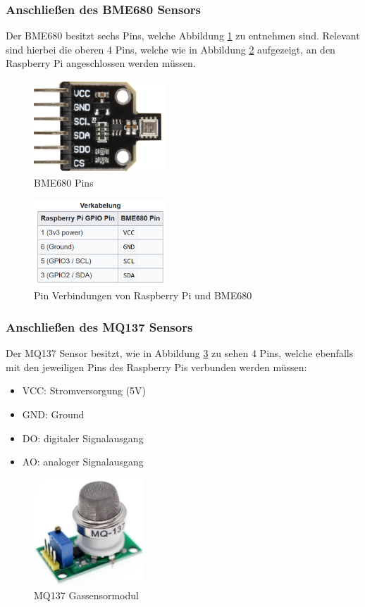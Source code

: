 \documentclass[conference]{IEEEtran}
\begin{document}
\subsubsection{Anschließen des BME680 Sensors} 


Der BME680 besitzt sechs Pins, welche Abbildung \ref{bme_pins} zu entnehmen sind. Relevant sind hierbei die oberen 4 Pins, welche wie in Abbildung \ref{verkabelung_bme} aufgezeigt, an den Raspberry Pi angeschlossen werden müssen. \cite{bme_anschluss}
\begin{figure}[H]
	\centering
	\includegraphics[width=50mm]{fig/bme_pins.png}
	\caption{BME680 Pins}
	\label{bme_pins}
\end{figure}
\begin{figure}[H]
	\centerline{\includegraphics[width=50mm]{fig/verkabelung_bme.png}}
	\caption{Pin Verbindungen von Raspberry Pi und BME680}
	\label{verkabelung_bme}
\end{figure}

\subsubsection{Anschließen des MQ137 Sensors} 

Der MQ137 Sensor besitzt, wie in Abbildung \ref{mq137_pins} zu sehen 4 Pins, welche ebenfalls mit den jeweiligen Pins des Raspberry Pis verbunden werden müssen:
\begin{itemize}
	\item VCC: Stromversorgung (5V)
	\item GND: Ground
	\item DO: digitaler Signalausgang
	\item AO: analoger Signalausgang
\end{itemize}
\begin{figure}[H]
	\centerline{\includegraphics[height=40mm]{fig/mq137_pins.png}}
	\caption{MQ137 Gassensormodul}
	\label{mq137_pins}
\end{figure}
\end{document}
